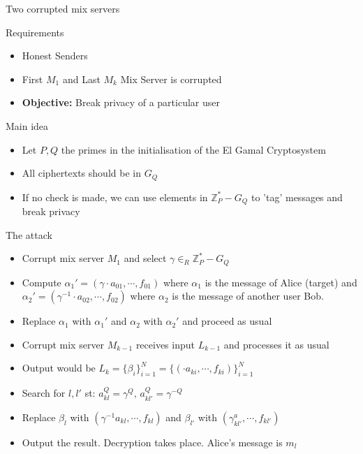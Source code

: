 \documentclass{beamer}
\begin{document}
\begin{frame}[allowframebreaks]{Two corrupted mix servers}
\begin{block}{Requirements}
\begin{itemize}
\item Honest Senders
\item First $M_1$ and Last  $M_k$ Mix Server is corrupted
\item \textbf{Objective:} Break privacy of a particular user
\end{itemize}
\end{block} 

\begin{block}{Main idea}
\begin{itemize}
\item Let $P,Q$ the primes in the initialisation of the El Gamal Cryptosystem
\item All ciphertexts should be in $G_Q$
\item If no check is made, we can use elements in $\mathbb{Z}_P^* - G_Q$ to 'tag' messages and break privacy
\end{itemize}
\end{block}

\begin{block}{The attack}
\begin{itemize}
\item Corrupt mix server $M_1$ and select $\gamma \in_R \mathbb{Z}_P^* - G_Q$
\item Compute $ \alpha_1' = (\gamma \cdot a_{01}, \cdots,  f_{01}) $ where $\alpha_1$ is the message of Alice (target) and $ \alpha_2' = (\gamma^{-1} \cdot a_{02}, \cdots,  f_{02}) $ where $\alpha_2$ is the message of another user Bob.
\item Replace $ \alpha_1 $ with $ \alpha_1' $ and $ \alpha_2 $ with $ \alpha_2' $ and proceed as usual
\item Corrupt mix server $M_{k-1}$ receives input $L_{k-1}$ and processes it as usual
\item Output would be $L_k = \{ \beta_i \}_{i=1}^{N} =  \{ (\cdot a_{ki}, \cdots,  f_{ki}) \}_{i=1}^{N} $
\item Search for $l, l'$ st: $a_{kl}^Q = \gamma ^ Q, \, a_{kl'}^{Q}= \gamma ^ {-Q} $
\item Replace $ \beta_l $ with $ (\gamma^{-1}a_{kl}, \cdots, f_{kl})   $ and $ \beta_{l'} $ with $ (\gamma^a_{kl'}, \cdots, f_{kl'})  $
\item Output the result. Decryption takes place. Alice's message is $m_l$
\end{itemize}
\end{block}


\end{frame}
\end{document}
